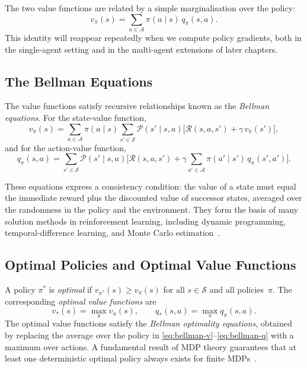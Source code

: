 \documentclass[a4paper,oneside,11pt]{report}
\begin{document}
The two value functions are related by a simple marginalisation over the policy:
\begin{equation}\label{eq:v-from-q}
  v_\pi(s) = \sum_{a\in\mathcal{A}} \pi(a\mid s)\, q_\pi(s,a).
\end{equation}
This identity will reappear repeatedly when we compute policy gradients, both in the single-agent setting and in the multi-agent extensions of later chapters.

\subsection{The Bellman Equations}
\label{subsec:bellman}

The value functions satisfy recursive relationships known as the \emph{Bellman equations}. For the state-value function,
\begin{equation}\label{eq:bellman-v}
  v_\pi(s) = \sum_{a\in\mathcal{A}} \pi(a\mid s) \sum_{s'\in\mathcal{S}} \mathcal{P}(s'\mid s,a) \bigl[\mathcal{R}(s,a,s') + \gamma\, v_\pi(s')\bigr],
\end{equation}
and for the action-value function,
\begin{equation}\label{eq:bellman-q}
  q_\pi(s,a) = \sum_{s'\in\mathcal{S}} \mathcal{P}(s'\mid s,a) \bigl[\mathcal{R}(s,a,s') + \gamma \sum_{a'\in\mathcal{A}} \pi(a'\mid s')\, q_\pi(s',a')\bigr].
\end{equation}

These equations express a consistency condition: the value of a state must equal the immediate reward plus the discounted value of successor states, averaged over the randomness in the policy and the environment. They form the basis of many solution methods in reinforcement learning, including dynamic programming, temporal-difference learning, and Monte Carlo estimation~\cite{sutton2018rl}.

\subsection{Optimal Policies and Optimal Value Functions}
\label{subsec:optimal}

A policy $\pi^*$ is \emph{optimal} if $v_{\pi^*}(s) \ge v_\pi(s)$ for all $s\in\mathcal{S}$ and all policies~$\pi$. The corresponding \emph{optimal value functions} are
\begin{equation}\label{eq:optimal-v-q}
  v_*(s) = \max_\pi v_\pi(s), \qquad q_*(s,a) = \max_\pi q_\pi(s,a).
\end{equation}
The optimal value functions satisfy the \emph{Bellman optimality equations}, obtained by replacing the average over the policy in \eqref{eq:bellman-v}--\eqref{eq:bellman-q} with a maximum over actions. A fundamental result of MDP theory guarantees that at least one deterministic optimal policy always exists for finite MDPs~\cite{sutton2018rl}.
\end{document}
